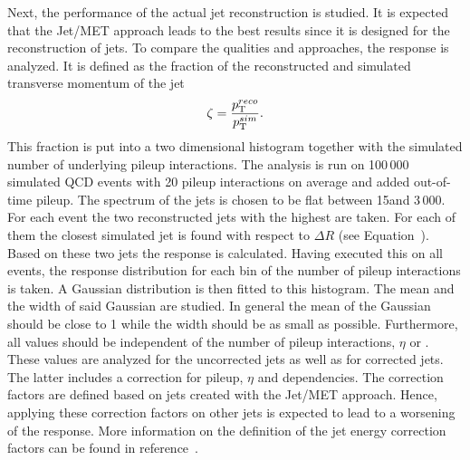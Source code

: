 Next, the performance of the actual jet reconstruction is studied. It is expected that the Jet/MET approach leads to the best results since it is designed for the reconstruction of jets. To compare the qualities and approaches, the \pt{} response is analyzed. It is defined as the fraction of the reconstructed and simulated transverse momentum of the jet
\begin{equation}
\zeta = \frac{p_{\mathrm{T}}^{reco}}{p_{\mathrm{T}}^{sim}}.
\label{eq:OOPtResponse}
\end{equation}
This fraction is put into a two dimensional histogram together with the simulated number of underlying pileup interactions. The analysis is run on 100\,000 simulated QCD events with 20 pileup interactions on average and added out-of-time pileup. The spectrum of the jets \pt is chosen to be flat between 15\GeV and 3\,000\GeV{}. For each event the two reconstructed jets with the highest \pt are taken. For each of them the closest simulated jet is found with respect to $\Delta{}R$ (see Equation~). Based on these two jets the \pt{} response is calculated. Having executed this on all events, the \pt{} response distribution for each bin of the number of pileup interactions is taken. A Gaussian distribution is then fitted to this histogram. The mean and the width of said Gaussian are studied. In general the mean of the Gaussian should be close to 1 while the width should be as small as possible. Furthermore, all values should be independent of the number of pileup interactions, $\eta$ or \pt{}. \\
These values are analyzed for the uncorrected jets as well as for corrected jets. The latter includes a correction for pileup, $\eta$ and \pt dependencies. The correction factors are defined based on jets created with the Jet/MET approach. Hence, applying these correction factors on other jets is expected to lead to a worsening of the \pt{} response. More information on the definition of the jet energy correction factors can be found in reference~.


